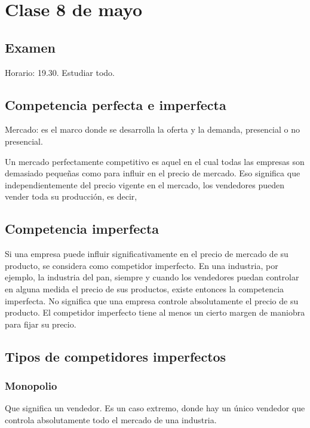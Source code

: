 \section{Clase 8 de mayo}

\subsection{Examen}

Horario: 19.30.
Estudiar todo.

\subsection{Competencia perfecta e imperfecta}

Mercado: es el marco donde se desarrolla la oferta y la demanda,
presencial o no presencial.

Un mercado perfectamente competitivo es aquel en el cual todas las empresas son demasiado pequeñas
como para influir en el precio de mercado.
Eso significa que independientemente del precio vigente en el mercado,
los vendedores pueden vender toda su producción,
es decir,

\subsection{Competencia imperfecta}

Si una empresa puede influir significativamente en el precio de mercado de su producto,
se considera como competidor imperfecto.
En una industria, por ejemplo, la industria del pan,
siempre y cuando los vendedores puedan controlar en alguna medida el precio de sus productos,
existe entonces la competencia imperfecta.
No significa que una empresa controle absolutamente el precio de su producto.
El competidor imperfecto tiene al menos un cierto margen de maniobra para fijar su precio.

\subsection{Tipos de competidores imperfectos}

\subsubsection{Monopolio}

Que significa un vendedor.
Es un caso extremo,
donde hay un único vendedor que controla absolutamente todo el mercado de una industria.

